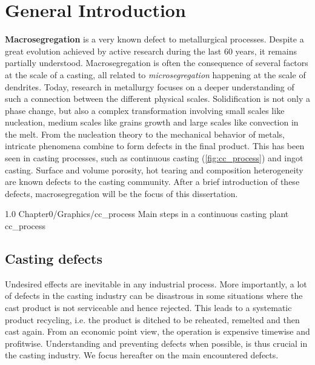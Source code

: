 \chapter{General Introduction}
\textbf{Macrosegregation} is a very known defect to metallurgical processes. Despite a great evolution achieved by active research during the last 60 years,
it remains partially understood. Macrosegregation is often  the consequence of several factors at the scale of a casting, all related to \emph{microsegregation} happening at the scale
of dendrites. Today, research in metallurgy focuses on a deeper understanding of such a connection between the different physical scales.
Solidification is not only a phase change, but also a complex transformation involving small scales like nucleation, medium scales
like grains growth and large scales like convection in the melt. From the nucleation theory to the mechanical behavior of metals, intricate phenomena combine to form defects in the final product. This has been seen in casting processes, such as continuous casting (\cref{fig:cc_process}) and ingot casting. Surface and volume porosity, hot tearing and composition heterogeneity are known defects to the casting community. After a brief introduction of these defects, macrosegregation will be the focus of this dissertation. 

\begin{figureth}
{1.0}
{Chapter0/Graphics/cc_process}
{Main steps in a continuous casting plant}
{cc_process}
\end{figureth}
\section{Casting defects}
Undesired effects are inevitable in any industrial process. More importantly, a lot of defects in the casting industry can be disastrous in some situations where the cast product is not serviceable and hence rejected. This leads to a systematic product recycling, i.e. the product is ditched to be reheated, remelted and then cast again. From an economic point view, the operation is expensive timewise and profitwise. Understanding and preventing defects when possible, is thus crucial in the casting industry. We focus hereafter on the main encountered defects.

